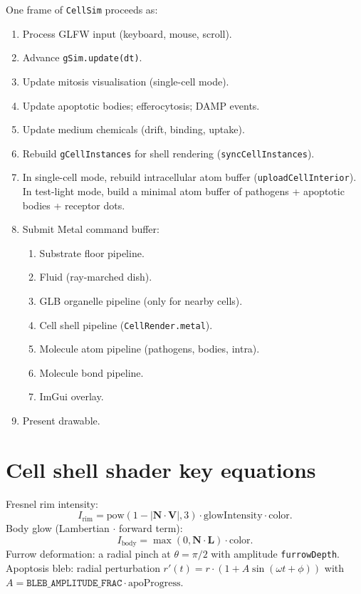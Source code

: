 \documentclass[11pt,letterpaper,twoside,openany]{book}
\newcommand{\code}[1]{\texttt{#1}}
\begin{document}
One frame of \code{CellSim} proceeds as:
\begin{enumerate}
  \item Process GLFW input (keyboard, mouse, scroll).
  \item Advance \code{gSim.update(dt)}.
  \item Update mitosis visualisation (single-cell mode).
  \item Update apoptotic bodies; efferocytosis; DAMP events.
  \item Update medium chemicals (drift, binding, uptake).
  \item Rebuild \code{gCellInstances} for shell rendering
        (\code{syncCellInstances}).
  \item In single-cell mode, rebuild intracellular atom buffer
        (\code{uploadCellInterior}). In test-light mode, build a
        minimal atom buffer of pathogens + apoptotic bodies +
        receptor dots.
  \item Submit Metal command buffer:
    \begin{enumerate}
      \item Substrate floor pipeline.
      \item Fluid (ray-marched dish).
      \item GLB organelle pipeline (only for nearby cells).
      \item Cell shell pipeline (\code{CellRender.metal}).
      \item Molecule atom pipeline (pathogens, bodies, intra).
      \item Molecule bond pipeline.
      \item ImGui overlay.
    \end{enumerate}
  \item Present drawable.
\end{enumerate}

\section{Cell shell shader key equations}

Fresnel rim intensity:
\begin{equation}
  I_{\text{rim}} = \text{pow}(1 - |\mathbf{N}\cdot\mathbf{V}|, 3)\cdot\text{glowIntensity}\cdot\text{color}.
\end{equation}
Body glow (Lambertian $\cdot$ forward term):
\begin{equation}
  I_{\text{body}} = \max(0, \mathbf{N}\cdot\mathbf{L})\cdot\text{color}.
\end{equation}
Furrow deformation: a radial pinch at $\theta = \pi/2$ with
amplitude \code{furrowDepth}. Apoptosis bleb: radial perturbation
$r'(t) = r\cdot(1 + A\sin(\omega t + \phi))$ with
$A = \code{BLEB\_AMPLITUDE\_FRAC} \cdot \text{apoProgress}$.
\end{document}

